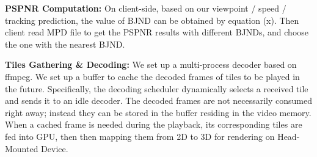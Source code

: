 \textbf{PSPNR Computation:} On client-side, based on our viewpoint / speed / tracking prediction, the value of BJND can be obtained by equation (x). Then client read MPD file to get the PSPNR results with different BJNDs, and choose the one with the nearest BJND.

\textbf{Tiles Gathering \& Decoding:} We set up a multi-process decoder based on ffmpeg. We set up a buffer to cache the decoded frames of tiles to be played in the future. Specifically, the decoding scheduler dynamically selects a received tile and sends it to an idle decoder. The decoded frames are not necessarily consumed right away; instead they can be stored in the buffer residing in the video memory. When a cached frame is needed during the playback, its corresponding tiles are fed into GPU, then then mapping them from 2D to 3D for rendering on Head-Mounted Device.